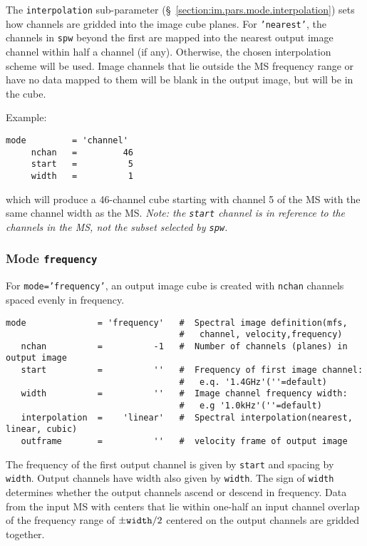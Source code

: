 The {\tt interpolation} sub-parameter
(\S~\ref{section:im.pars.mode.interpolation}) sets how channels are
gridded into the image cube planes.  For {\tt 'nearest'}, the
channels in {\tt spw} beyond the first are mapped
into the nearest output image channel within half a channel (if
any).  Otherwise, the chosen interpolation scheme will be used.
Image channels that lie outside the MS frequency range or
have no data mapped to them will be blank in the output image,
but will be in the cube.  

Example: 
\small
\begin{verbatim}
mode         = 'channel'       
     nchan   =         46   
     start   =          5   
     width   =          1   
\end{verbatim}
\normalsize
which will produce a 46-channel cube starting with channel 5 of the MS
with the same channel width as the MS.  {\em Note: the {\tt start}
channel is in reference to the channels in the MS, not the subset
selected by {\tt spw}.}

\subsubsection{Mode {\tt frequency} }
\label{section:im.pars.mode.frequency}

For {\tt mode='frequency'}, an output image cube is created
with {\tt nchan} channels spaced evenly in frequency.
\small
\begin{verbatim}
mode              = 'frequency'   #  Spectral image definition(mfs,
                                  #   channel, velocity,frequency)
   nchan          =          -1   #  Number of channels (planes) in output image
   start          =          ''   #  Frequency of first image channel:
                                  #   e.q. '1.4GHz'(''=default)
   width          =          ''   #  Image channel frequency width:
                                  #   e.g '1.0kHz'(''=default)
   interpolation  =    'linear'   #  Spectral interpolation(nearest, linear, cubic)
   outframe       =          ''   #  velocity frame of output image
\end{verbatim}
\normalsize
The frequency of the first output channel is given by {\tt start}
and spacing by {\tt width}.  Output channels have width also given by {\tt width}.
The sign of {\tt width}
determines whether the output channels ascend or descend in
frequency.  Data from the input MS with centers that lie within one-half an input
channel overlap of the frequency range of $\pm{\tt width}/2$ centered
on the output channels are gridded together.  

